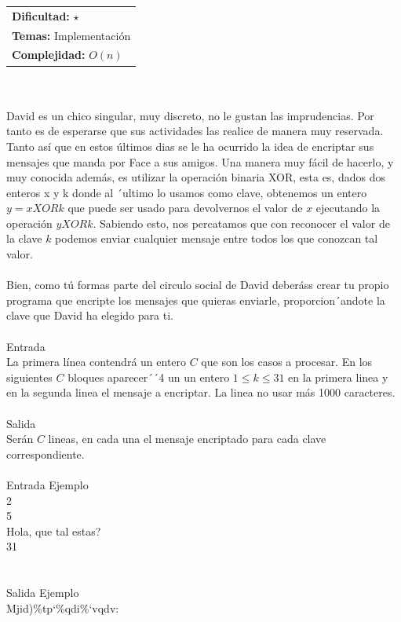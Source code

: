 \documentclass[12pt]{article}
\begin{document}
\hfill
\begin{tabular}{@{}l@{}}
\textbf{Dificultad:} $\star$ \\
\textbf{Temas:} Implementación \\
\textbf{Complejidad:} $O(n)$
\end{tabular}
\\
\\
David es un chico singular, muy discreto, no le gustan las imprudencias. Por tanto es de esperarse que sus actividades las realice de manera muy reservada. Tanto así que en estos últimos dias se le ha ocurrido la idea de encriptar sus mensajes que manda por Face a sus amigos. Una manera muy fácil de hacerlo, y muy conocida además, es utilizar la operación binaria XOR, esta es, dados dos enteros x y k donde al ´ultimo lo usamos como clave, obtenemos un entero $y = x XOR k$ que puede ser usado para devolvernos el valor de $x$ ejecutando la operación $y XOR k$. Sabiendo esto, nos percatamos que con reconocer el valor de la clave $k$ podemos enviar cualquier mensaje entre todos los que conozcan tal valor.\\ \\Bien, como tú formas parte del circulo social de David deberáss crear tu
propio programa que encripte los mensajes que quieras enviarle, proporcion´andote la clave que David ha elegido para ti.
\\
\\
\textrm{\large Entrada}
\\
La primera línea contendrá un entero $C$ que son los casos a procesar. En los siguientes $C$ bloques aparecer´´4 un un entero $1 ≤ k ≤ 31$ en la primera linea y en la segunda linea el mensaje a encriptar. La linea no usar más 1000 caracteres.
\\
\\
\textrm{\large Salida}
\\
Serán $C$ lineas, en cada una el mensaje encriptado para cada clave correspondiente.
\\
\\
\textrm{\large Entrada Ejemplo}
\\
2\\
5\\
Hola, que tal estas?\\
31\\
\\
\\
\textrm{\large Salida Ejemplo}
\\
Mjid)\%tp‘\%qdi\%‘vqdv:\\
\end{document}
